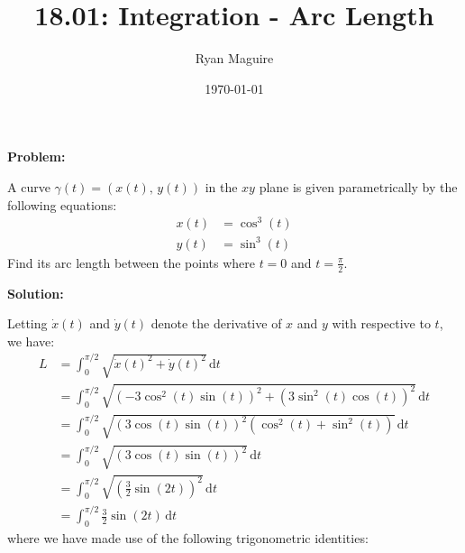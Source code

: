 \documentclass{article}
\title{18.01: Integration - Arc Length}
\author{Ryan Maguire}
\date{\today}
\newif\ifsolution
\begin{document}
    \maketitle
    \textbf{Problem:}
    \par\hfill\par
    A curve $\gamma(t)=\left(x(t),\,y(t)\right)$
    in the $xy$ plane is given parametrically by the following equations:
    \begin{subequations}
        \begin{align}
            x(t)&=\cos^{3}(t)\\
            y(t)&=\sin^{3}(t)
        \end{align}
    \end{subequations}
    Find its arc length between the points where $t=0$ and $t=\frac{\pi}{2}$.
    \ifsolution
        \par\hfill\par
        \color{blue}
        \textbf{Solution:}
        \par\hfill\par
        Letting $\dot{x}(t)$ and $\dot{y}(t)$ denote the derivative of
        $x$ and $y$ with respective to $t$, we have:
        \begin{subequations}
            \begin{align}
                L&=\int_{0}^{\pi/2}
                    \sqrt{\dot{x}(t)^{2}+\dot{y}(t)^{2}}\,\textrm{d}t\\
                &=\int_{0}^{\pi/2}
                    \sqrt{
                        \left(-3\cos^{2}(t)\sin(t)\right)^{2}
                        +\left(3\sin^{2}(t)\cos(t)\right)^{2}
                    }\,\textrm{d}t\\
                &=\int_{0}^{\pi/2}
                    \sqrt{
                        \left(3\cos(t)\sin(t)\right)^{2}
                        \left(\cos^{2}(t)+\sin^{2}(t)\right)
                    }\,\textrm{d}t\\
                &=\int_{0}^{\pi/2}
                    \sqrt{\left(3\cos(t)\sin(t)\right)^{2}}\,\textrm{d}t\\
                &=\int_{0}^{\pi/2}
                    \sqrt{\left(\frac{3}{2}\sin(2t)\right)^{2}}\,\textrm{d}t\\
                &=\int_{0}^{\pi/2}\frac{3}{2}\sin(2t)\,\textrm{d}t
            \end{align}
        \end{subequations}
        where we have made use of the following trigonometric identities:
\end{document}
